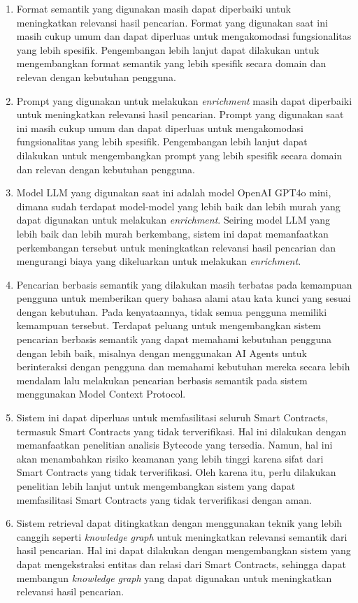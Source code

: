 \begin{enumerate}
	\item Format semantik yang digunakan masih dapat diperbaiki untuk meningkatkan relevansi hasil pencarian. Format yang digunakan saat ini masih cukup umum dan dapat diperluas untuk mengakomodasi fungsionalitas yang lebih spesifik. Pengembangan lebih lanjut dapat dilakukan untuk mengembangkan format semantik yang lebih spesifik secara domain dan relevan dengan kebutuhan pengguna.
	\item Prompt yang digunakan untuk melakukan \textit{enrichment} masih dapat diperbaiki untuk meningkatkan relevansi hasil pencarian. Prompt yang digunakan saat ini masih cukup umum dan dapat diperluas untuk mengakomodasi fungsionalitas yang lebih spesifik. Pengembangan lebih lanjut dapat dilakukan untuk mengembangkan prompt yang lebih spesifik secara domain dan relevan dengan kebutuhan pengguna.
	\item Model LLM yang digunakan saat ini adalah model OpenAI GPT4o mini, dimana sudah terdapat model-model yang lebih baik dan lebih murah yang dapat digunakan untuk melakukan \textit{enrichment}. Seiring model LLM yang lebih baik dan lebih murah berkembang, sistem ini dapat memanfaatkan perkembangan tersebut untuk meningkatkan relevansi hasil pencarian dan mengurangi biaya yang dikeluarkan untuk melakukan \textit{enrichment}.
	\item Pencarian berbasis semantik yang dilakukan masih terbatas pada kemampuan pengguna untuk memberikan query bahasa alami atau kata kunci yang sesuai dengan kebutuhan. Pada kenyataannya, tidak semua pengguna memiliki kemampuan tersebut. Terdapat peluang untuk mengembangkan sistem pencarian berbasis semantik yang dapat memahami kebutuhan pengguna dengan lebih baik, misalnya dengan menggunakan AI Agents untuk berinteraksi dengan pengguna dan memahami kebutuhan mereka secara lebih mendalam lalu melakukan pencarian berbasis semantik pada sistem menggunakan Model Context Protocol.
	\item Sistem ini dapat diperluas untuk memfasilitasi seluruh Smart Contracts, termasuk Smart Contracts yang tidak terverifikasi. Hal ini dilakukan dengan memanfaatkan penelitian analisis Bytecode yang tersedia. Namun, hal ini akan menambahkan risiko keamanan yang lebih tinggi karena sifat dari Smart Contracts yang tidak terverifikasi. Oleh karena itu, perlu dilakukan penelitian lebih lanjut untuk mengembangkan sistem yang dapat memfasilitasi Smart Contracts yang tidak terverifikasi dengan aman.
	\item Sistem retrieval dapat ditingkatkan dengan menggunakan teknik yang lebih canggih seperti \textit{knowledge graph} untuk meningkatkan relevansi semantik dari hasil pencarian. Hal ini dapat dilakukan dengan mengembangkan sistem yang dapat mengekstraksi entitas dan relasi dari Smart Contracts, sehingga dapat membangun \textit{knowledge graph} yang dapat digunakan untuk meningkatkan relevansi hasil pencarian.

\end{enumerate}

